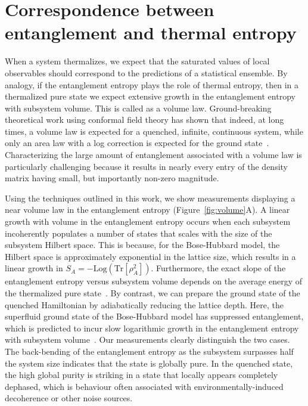 \section{Correspondence between entanglement and thermal entropy}

When a system thermalizes, we expect that the saturated values of local observables should correspond to the predictions of a statistical ensemble. By analogy, if the entanglement entropy plays the role of thermal entropy, then in a thermalized pure state we expect extensive growth in the entanglement entropy with subsystem volume. This is called as a volume law. Ground-breaking theoretical work using conformal field theory has shown that indeed, at long times, a volume law is expected for a quenched, infinite, continuous system, while only an area law with a log correction is expected for the ground state~\cite{Calabrese2004, Calabrese2005, Rivas2010}. Characterizing the large amount of entanglement associated with a volume law is particularly challenging because it results in nearly every entry of the density matrix having small, but importantly non-zero magnitude. 

Using the techniques outlined in this work, we show measurements displaying a near volume law in the entanglement entropy (Figure~\ref{fig:volume}A). A linear growth with volume in the entanglement entropy occurs when each subsystem incoherently populates a number of states that scales with the size of the subsystem Hilbert space. This is because, for the Bose-Hubbard model, the Hilbert space is approximately exponential in the lattice size, which results in a linear growth in $S_A = -\textrm{Log}(\textrm{Tr}[\rho_{A}^2])$. Furthermore, the exact slope of the entanglement entropy versus subsystem volume depends on the average energy of the thermalized pure state~\cite{Garrison2015}. By contrast, we can prepare the ground state of the quenched Hamiltonian by adiabatically reducing the lattice depth. Here, the superfluid ground state of the Bose-Hubbard model has suppressed entanglement, which is predicted to incur slow logarithmic growth in the entanglement entropy with subsystem volume~\cite{Calabrese2004}. Our measurements clearly distinguish the two cases. The back-bending of the entanglement entropy as the subsystem surpasses half the system size indicates that the state is globally pure. In the quenched state, the high global purity is striking in a state that locally appears completely dephased, which is behaviour often associated with environmentally-induced decoherence or other noise sources. 

